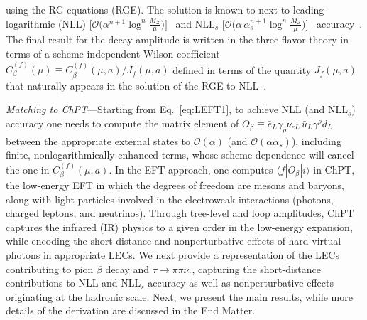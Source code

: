 \documentclass[prl,twocolumn,twoside,preprintnumbers,superscriptaddress,nofootinbib,letterpaper]{revtex4-1}
\newcommand{\Order}{\mathcal{O}}
\begin{document}
using the RG equations (RGE). The solution is known to  next-to-leading-logarithmic (NLL)
$\big[\Order \big(\alpha^{n+1} \log^n\frac{M_Z}{\mu}\big)\big]$~\cite{Cirigliano:2023fnz}
and $\text{NLL}_s$  $\big[\Order \big(\alpha \, \alpha_s^{n+1} \log^n\frac{M_Z}{\mu}\big)\big]$~\cite{Gorbahn:2025ssv} accuracy~\cite{Supp}.\nocite{Moussallam:1997xx,Buras:1989xd,FlavourLatticeAveragingGroupFLAG:2024oxs,Maltman:2008bx,PACS-CS:2009zxm,McNeile:2010ji,Chakraborty:2014aca,Bruno:2017gxd,Bazavov:2019qoo,Cali:2020hrj,Ayala:2020odx,Petreczky:2020tky,DallaBrida:2022eua,Parker:2018vye,Morel:2020dww,Fan:2022eto,Sturm:2013uka,Davier:2019can,Keshavarzi:2019abf,Ce:2022eix,Erler:2023hyi,Conigli:2025qvh,Chetyrkin:1996cf,Fanchiotti:1992tu}
The final result for the decay amplitude
is written  in the three-flavor theory in terms of a scheme-independent Wilson coefficient
$\bar C_\beta^{(f)}  (\mu)  \equiv C^{(f)}_\beta (\mu, a)/J_f (\mu,a)$
defined in terms of the quantity $J_f(\mu,a)$ that naturally appears in the
solution of the RGE to NLL~\cite{Supp}.



\emph{Matching to ChPT}---Starting from Eq.~\eqref{eq:LEFT1}, to achieve  NLL (and NLL$_s$)  accuracy one needs to compute the matrix element
of $O_\beta \equiv     \bar e_L\gamma_\rho \nu_{eL}\,\bar u_L\gamma^\rho d_L$ between the appropriate external states
to  $\Order(\alpha)$ (and   $\Order(\alpha \alpha_s)$),  including finite, nonlogarithmically enhanced terms, whose scheme dependence will
cancel the one in $C^{(f)}_\beta (\mu,a)$.
In the EFT approach,   one   computes   $\langle f | O_\beta | i \rangle$ in ChPT,
the low-energy EFT in which the degrees of freedom are mesons and baryons,  along with light  particles involved in the electroweak interactions  (photons, charged leptons, and neutrinos).  Through tree-level and loop amplitudes,  ChPT  captures the infrared (IR) physics to a given order in the low-energy expansion, while  encoding the
short-distance  and  nonperturbative  effects of hard virtual photons in appropriate LECs.
We next provide a representation of the LECs contributing to pion $\beta$ decay and $\tau\to\pi\pi\nu_\tau$, capturing the short-distance contributions
to NLL and NLL$_s$ accuracy as well as nonperturbative effects originating at  the hadronic scale.
Next, we present the main results, while more details of the derivation are discussed in the End Matter.
\end{document}
